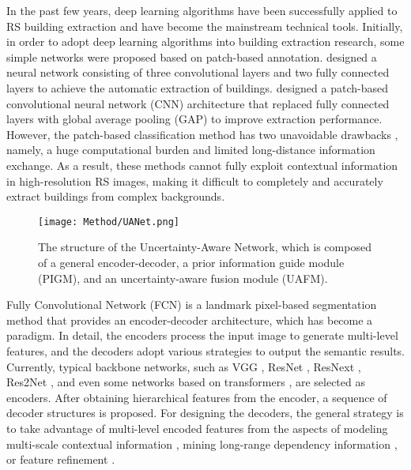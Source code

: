 \documentclass[lettersize,journal]{IEEEtran}
\begin{document}
\par
In the past few years, deep learning algorithms have been successfully applied to RS building extraction and have become the mainstream technical tools. Initially, in order to adopt deep learning algorithms into building extraction research, some simple networks were proposed based on patch-based annotation. \cite{MOE} designed a neural network consisting of three convolutional layers and two fully connected layers to achieve the automatic extraction of buildings. \cite{Simultaneous} designed a patch-based convolutional neural network (CNN) architecture that replaced fully connected layers with global average pooling (GAP) to improve extraction performance. However, the patch-based classification method has two unavoidable drawbacks \cite{luo2021deep}, namely, a huge computational burden and limited long-distance information exchange. As a result, these methods cannot fully exploit contextual information in high-resolution RS images, making it difficult to completely and accurately extract buildings from complex backgrounds.

\begin{figure*}[t]
\centering
\texttt{[image: Method/UANet.png]}
\caption{The structure of the Uncertainty-Aware Network, which is composed of a general encoder-decoder, a prior information guide module (PIGM), and an uncertainty-aware fusion module (UAFM). }
\vspace{-1.0em}
\label{fig_2}
\end{figure*}
\par

Fully Convolutional Network (FCN) \cite{FCN} is a landmark pixel-based segmentation method that provides an encoder-decoder architecture, which has become a paradigm. In detail, the encoders process the input image to generate multi-level features, and the decoders adopt various strategies to output the semantic results. Currently, typical backbone networks, such as VGG \cite{VGG}, ResNet \cite{ResNet}, ResNext \cite{ResNext}, Res2Net \cite{Res2Net}, and even some networks based on transformers \cite{SwinTransformer, PVT}, are selected as encoders. After obtaining hierarchical features from the encoder, a sequence of decoder structures is proposed. For designing the decoders, the general strategy is to take advantage of multi-level encoded features from the aspects of modeling multi-scale contextual information \cite{Deeplabv3+,RFB,small_object_segmentation,ASF-Net,MSNet,fang2022context}, mining long-range dependency information \cite{Self-attention-building,Non-local,DANet,DSNet,SAB_Net,song2023denoised}, or feature refinement \cite{CBRNet,FPCRF,DAD}.
\end{document}
